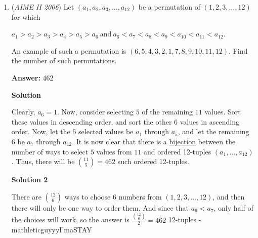 \begin{enumerate}
 
-jackshi2006

 



\textbf{Solution 5 (simpler solution 4)}

Consider all integers from 1 - 200. Because $3 \ \not | \ 200$, we just count number of integers from 1 - 200 divisble by 3. Half of those would be even, so we divide by 2, and we have the odd numbers with at least one power of 3. Between all odd numbers 1 - 200, we have 33 factors of 3. From 1 - 200, we have 11 factors of 9. From 1 - 200, we have 4 powers of 27 (found as $200 \pmod{27} = 11 < 13 \pmod{27}$), and 1 power of 81. So, the count total is $33 + 11 + 4 + 1 = \boxed{049}$.

 


	\item (\textit{AIME II 2006}) Let $(a_1,a_2,a_3,\ldots,a_{12})$ be a permutation of $(1,2,3,\ldots,12)$ for which


 $a_1>a_2>a_3>a_4>a_5>a_6 \mathrm{\  and \ } a_6<a_7<a_8<a_9<a_{10}<a_{11}<a_{12}.$

 An example of such a permutation is $(6,5,4,3,2,1,7,8,9,10,11,12).$ Find the number of such permutations.


 
 \textbf{Answer: }462



\textbf{Solution}

Clearly, $a_6=1$.  Now, consider selecting $5$ of the remaining $11$ values.  Sort these values in descending order, and sort the other $6$ values in ascending order.  Now, let the $5$ selected values be $a_1$ through $a_5$, and let the remaining $6$ be $a_7$ through ${a_{12}}$.  It is now clear that there is a \href{https://artofproblemsolving.com/wiki/index.php?title=Bijection}{bijection} between the number of ways to select $5$ values from $11$ and ordered 12-tuples $(a_1,\ldots,a_{12})$.  Thus, there will be ${11 \choose 5}=\boxed{462}$ such ordered 12-tuples.

 



\textbf{Solution 2}

There are $\binom{12}{6}$ ways to choose 6 numbers from $(1,2,3,\ldots,12)$, and then there will only be one way to order them. And since that $a_6<a_7$, only half of the choices will work, so the answer is $\frac{\binom{12}{6}}{2}=462$ 12-tuples - mathleticguyyyI’maSTAY

 




\end{enumerate}
